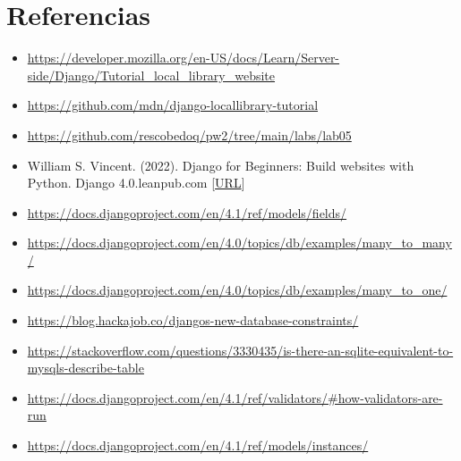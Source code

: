 \documentclass{article}
\begin{document}
\section{Referencias}
        \begin{itemize}
            \item \url{https://developer.mozilla.org/en-US/docs/Learn/Server-side/Django/Tutorial_local_library_website}
            \item \url{https://github.com/mdn/django-locallibrary-tutorial}
            \item \url{https://github.com/rescobedoq/pw2/tree/main/labs/lab05}
            \item William S. Vincent. (2022). Django for Beginners: Build websites with Python. Django 4.0.leanpub.com [\href{http://library.lol/main/22AF742D96697DE55EF5F88B08F1AA86}{URL}]
            \item \url{https://docs.djangoproject.com/en/4.1/ref/models/fields/}
            \item \url{https://docs.djangoproject.com/en/4.0/topics/db/examples/many_to_many/}
            \item \url{https://docs.djangoproject.com/en/4.0/topics/db/examples/many_to_one/}
            \item \url{https://blog.hackajob.co/djangos-new-database-constraints/}
            \item \url{https://stackoverflow.com/questions/3330435/is-there-an-sqlite-equivalent-to-mysqls-describe-table}
            \item \url{https://docs.djangoproject.com/en/4.1/ref/validators/#how-validators-are-run}
            \item \url{https://docs.djangoproject.com/en/4.1/ref/models/instances/}
        \end{itemize}
\end{document}
